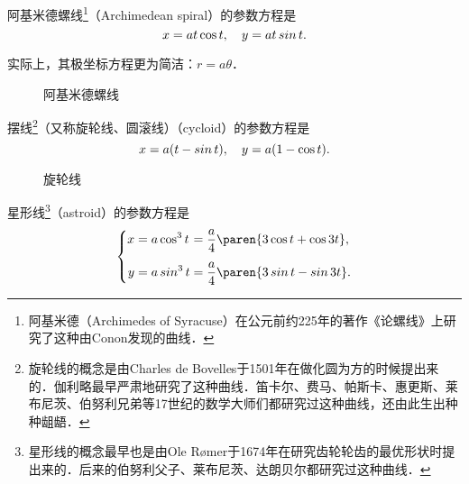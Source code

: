 \begin{definition*}
  阿基米德螺线\footnote{阿基米德（Archimedes of Syracuse）在公元前约225年的著作《论螺线》上研究了这种由Conon发现的曲线．}（Archimedean spiral）的参数方程是
  \[
    \setlength{\abovedisplayskip}{.8ex}
    \setlength{\belowdisplayskip}{.8ex}
    x = at \cos t, \quad y = at \sin t.
  \]

  \begin{remark}
    实际上，其极坐标方程更为简洁：\(r = a \theta\)．
  \end{remark}
\end{definition*}

\begin{figure}[H]
  \centering
  \caption*{阿基米德螺线}
\end{figure}

\begin{definition*}
  摆线\footnote{旋轮线的概念是由Charles de Bovelles于1501年在做化圆为方的时候提出来的．伽利略最早严肃地研究了这种曲线．笛卡尔、费马、帕斯卡、惠更斯、莱布尼茨、伯努利兄弟等17世纪的数学大师们都研究过这种曲线，还由此生出种种龃龉．}（又称旋轮线、圆滚线）（cycloid）的参数方程是
  \[
    \setlength{\abovedisplayskip}{.8ex}
    x = a (t - \sin t), \quad y = a (1 - \cos t).
  \]
\end{definition*}

\begin{figure}[H]
  \centering
  \caption*{旋轮线}
\end{figure}

\begin{definition*}
  星形线\footnote{星形线的概念最早也是由Ole Rømer于1674年在研究齿轮轮齿的最优形状时提出来的．后来的伯努利父子、莱布尼茨、达朗贝尔都研究过这种曲线．}（astroid）的参数方程是
  \[
    \left\{
      \addtolength{\jot}{1ex}
      \begin{alignedat}{2}
        x &= a \cos^3 t &&= \frac a4 \paren{3 \cos t + \cos 3t}, \\
        y &= a \sin^3 t &&= \frac a4 \paren{3 \sin t - \sin 3t}.
      \end{alignedat}
    \right.
  \]
\end{definition*}

